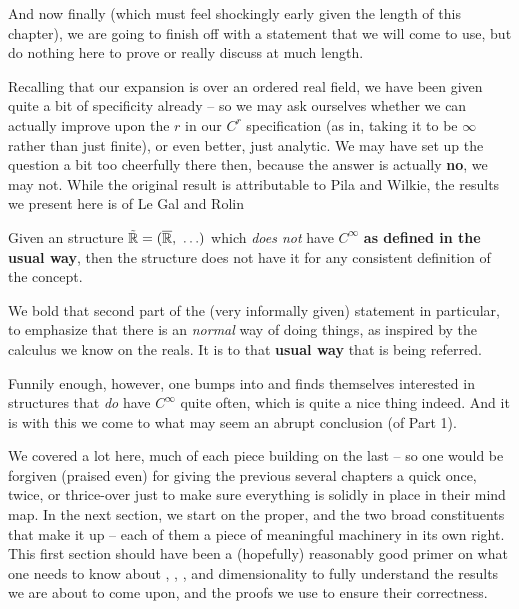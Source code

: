 And now finally (which must feel shockingly early given the length of this chapter), we are going to finish off with a statement that we will come to use, but do nothing here to prove or really discuss at much length.

Recalling that our expansion is over an ordered real field, we have been given quite a bit of specificity already -- so we may ask ourselves whether we can actually improve upon the $r$ in our $C^r$ specification (as in, taking it to be $\infty$ rather than just finite), or even better, just analytic. We may have set up the question a bit too cheerfully there then, because the answer is actually \textbf{no}, we may not. While the original result is attributable to Pila and Wilkie, the results we present here is of Le Gal and Rolin \cite{gal_o-minimal_2009}

\begin{proposition}
  Given an \om structure $\tilde{\mathbb{R}} = (\overline{\mathbb{R}}, \ \hdots)$ which \emph{does not} have $C^{\infty}$ \cd \textbf{as defined in the usual way}, then the structure does not have it for any consistent definition of the concept.
\end{proposition}

We bold that second part of the (very informally given) statement in particular, to emphasize that there is an \emph{normal} way of doing things, as inspired by the calculus we know on the reals. It is to that \textbf{usual way} that is being referred.

Funnily enough, however, one bumps into and finds themselves interested in structures that \emph{do} have $C^{\infty}$ \cd quite often, which is quite a nice thing indeed. And it is with this we come to what may seem an abrupt conclusion (of Part 1).

We covered a lot here, much of each piece building on the last -- so one would be forgiven (praised even) for giving the previous several chapters a quick once, twice, or thrice-over just to make sure everything is solidly in place in their mind map. In the next section, we start on the \pwt proper, and the two broad constituents that make it up -- each of them a piece of meaningful machinery in its own right. This first section should have been a (hopefully) reasonably good primer on what one needs to know about \om, \cds, \scds, and dimensionality to fully understand the results we are about to come upon, and the proofs we use to ensure their correctness.
